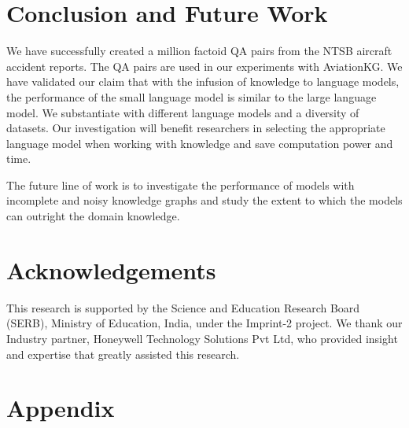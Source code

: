 \documentclass[11pt]{article}
\begin{document}
\section{Conclusion and Future Work}
We have successfully created a million factoid QA pairs from the NTSB aircraft accident reports. The QA pairs are used in our experiments with AviationKG. 
We have validated our claim that with the infusion of knowledge to language models, the performance of the small language model is similar to the large language model. We substantiate with different language models and a diversity of datasets. Our investigation will benefit researchers in selecting the appropriate language model when working with knowledge and save computation power and time.
\par
The future line of work is to investigate the performance of models with incomplete and noisy knowledge graphs and study the extent to which the models can outright the domain knowledge. 




\section*{Acknowledgements}
This research is supported by the Science and Education Research Board (SERB), Ministry of Education, India, under the Imprint-2 project. We thank our Industry partner, Honeywell Technology Solutions Pvt Ltd, who provided insight and expertise that greatly assisted this research.

\nocite{*}



\appendix

\section{Appendix}
\label{sec:appendix}
\end{document}
